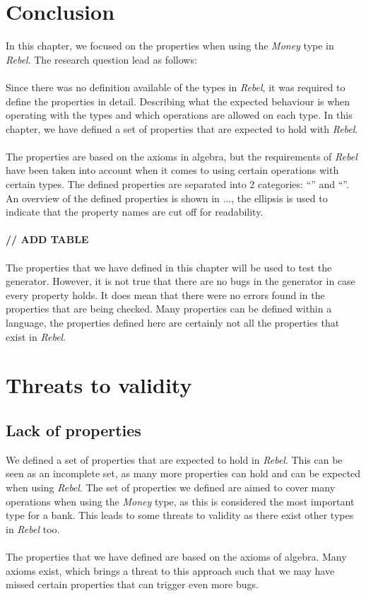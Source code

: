\section{Conclusion}
In this chapter, we focused on the properties when using the \textit{Money}
type in \textit{Rebel}. The research question lead as follows:\rqOne\\
\\
Since there was no definition available of the types in \textit{Rebel}, it was
required to define the properties in detail. Describing what the expected
behaviour is when operating with the types and which operations are allowed on
each type. In this chapter, we have defined a set of properties that are
expected to hold with \textit{Rebel}.\\
\\
The properties are based on the axioms in algebra, but the requirements of
\textit{Rebel} have been taken into account when it comes to using certain
operations with certain types. The defined properties are separated into 2
categories: ``'' and
``''. An overview of the
defined properties is shown in ..., the ellipsis is used to
indicate that the property names are cut off for readability.\\
\\
\textbf{// ADD TABLE}
\\
\\
The properties that we have defined in this chapter will be used to test the
generator. However, it is not true that there are no bugs in the generator in
case every property holds. It does mean that there were no errors found in the
properties that are being checked. Many properties can be defined within a
language, the properties defined here are certainly not all the properties that
exist in \textit{Rebel}.

\section{Threats to validity}
\subsection*{Lack of properties}
We defined a set of properties that are expected to hold in \textit{Rebel}.
This can be seen as an incomplete set, as many more properties can hold and can
be expected when using \textit{Rebel}. The set of properties we defined are
aimed to cover many operations when using the \textit{Money} type, as this is
considered the most important type for a bank. This leads to some threats to
validity as there exist other types in \textit{Rebel} too.\\
\\
The properties that we have defined are based on the axioms of algebra. Many
axioms exist, which brings a threat to this approach such that we may have
missed certain properties that can trigger even more bugs.

